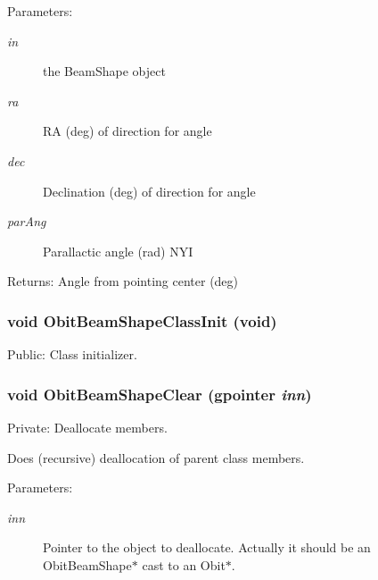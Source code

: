 \begin{Desc}
\item[Parameters:]
\begin{description}
\item[{\em in}]the Beam\-Shape object \item[{\em ra}]RA (deg) of direction for angle \item[{\em dec}]Declination (deg) of direction for angle \item[{\em par\-Ang}]Parallactic angle (rad) NYI \end{description}
\end{Desc}
\begin{Desc}
\item[Returns:]Angle from pointing center (deg) \end{Desc}
\subsubsection{\setlength{\rightskip}{0pt plus 5cm}void Obit\-Beam\-Shape\-Class\-Init (void)}\label{ObitBeamShape_8c_a14}


Public: Class initializer. 

\subsubsection{\setlength{\rightskip}{0pt plus 5cm}void Obit\-Beam\-Shape\-Clear (gpointer {\em inn})}\label{ObitBeamShape_8c_a4}


Private: Deallocate members. 

Does (recursive) deallocation of parent class members. \begin{Desc}
\item[Parameters:]
\begin{description}
\item[{\em inn}]Pointer to the object to deallocate. Actually it should be an Obit\-Beam\-Shape$\ast$ cast to an Obit$\ast$. \end{description}
\end{Desc}
